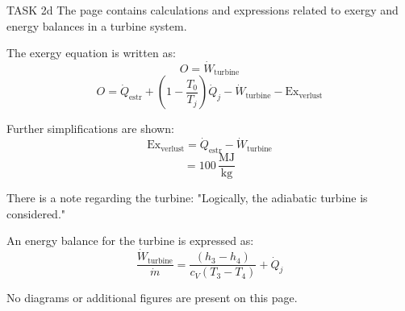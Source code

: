TASK 2d  
The page contains calculations and expressions related to exergy and energy balances in a turbine system.  

The exergy equation is written as:  
\[
O = \dot{W}_{\text{turbine}}
\]  
\[
O = \dot{Q}_{\text{estr}} + \left(1 - \frac{T_0}{T_j}\right) \dot{Q}_j - \dot{W}_{\text{turbine}} - \text{Ex}_{\text{verlust}}
\]  

Further simplifications are shown:  
\[
\text{Ex}_{\text{verlust}} = \dot{Q}_{\text{estr}} - \dot{W}_{\text{turbine}}
\]  
\[
= 100 \, \frac{\text{MJ}}{\text{kg}}
\]  

There is a note regarding the turbine:  
"Logically, the adiabatic turbine is considered."  

An energy balance for the turbine is expressed as:  
\[
\frac{\dot{W}_{\text{turbine}}}{\dot{m}} = \frac{(h_3 - h_4)}{c_V (T_3 - T_4)} + \dot{Q}_j
\]  

No diagrams or additional figures are present on this page.